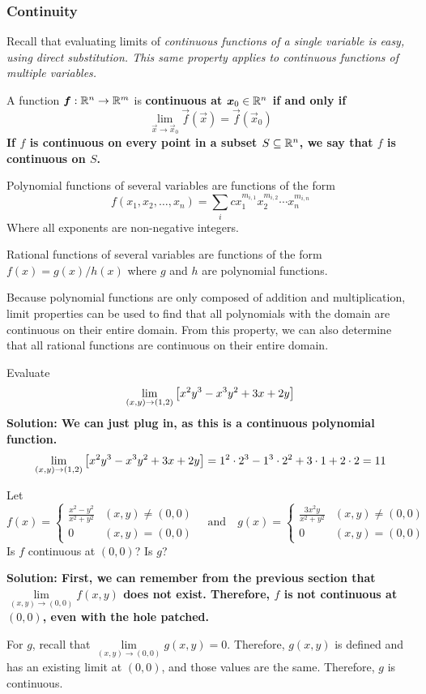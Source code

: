 \subsubsection{Continuity}
Recall that evaluating limits of \it{continuous} functions of a single variable is easy, using direct substitution. This same property applies to continuous functions of multiple variables.
\begin{definition}
    A function \(\boldsymbol{f}: \mathbb{R}^n\to \mathbb{R}^m\) is \bf{continuous} at \(\boldsymbol{x}_0\in\mathbb{R}^n\) if and only if 
    \[ \lim_{\vec x\to \vec x_0}\vec f(\vec x) = \vec f(\vec x_0)\]
    If \(f\) is continuous on every point in a subset \(S\subseteq \mathbb{R}^n\), we say that \(f\) is continuous on \(S\).
\end{definition}
Polynomial functions of several variables are functions of the form
\[ f(x_1, x_2, \dots, x_n) = \sum_{i} cx_1^{m_{i,1}}x_2^{m_{i,2}}\cdots x_n^{m_{i,n}}\]
Where all exponents are non-negative integers. \par
Rational functions of several variables are functions of the form \(f(x)=g(x)/h(x)\) where \(g\) and \(h\) are polynomial functions. \par
Because polynomial functions are only composed of addition and multiplication, limit properties can be used to find that all polynomials with the domain are continuous on their entire domain. From this property, we can also determine that all rational functions are continuous on their entire domain.
\begin{example}
    Evaluate 
    \[ \lim_{(x,y)\to(1,2)}\bqty{x^2y^3-x^3y^2+3x+2y}\]
    \bf{Solution: }We can just plug in, as this is a continuous polynomial function.
    \[ \lim_{(x,y)\to(1,2)}\bqty{x^2y^3-x^3y^2+3x+2y} = 1^2\cdot 2^3 - 1^3\cdot 2^2 + 3\cdot 1 + 2\cdot 2 = 11 \]
\end{example}
\begin{example}
    Let \[ f(x) = \begin{cases}
        \frac{x^2-y^2}{x^2+y^2} & (x,y)\neq (0, 0) \\
        0 & (x,y)=(0,0)
    \end{cases}\quad\text{and}\quad g(x)=\begin{cases}
        \frac{3x^2y}{x^2+y^2} & (x,y)\neq(0,0) \\
        0 & (x, y) = (0,0)
    \end{cases}\]
    Is \(f\) continuous at \((0,0)\)? Is \(g\)?\par\bf{Solution: }First, we can remember from the previous section that \(\lim\limits_{(x,y)\to(0,0)}f(x,y)\) does not exist. Therefore, \(f\) is not continuous at \((0,0)\), even with the hole patched. \par
    For \(g\), recall that \(\lim\limits_{(x,y)\to(0,0)}g(x,y)=0\). Therefore, \(g(x,y)\) is defined and has an existing limit at \((0,0)\), and those values are the same. Therefore, \(g\) is continuous.
\end{example}
